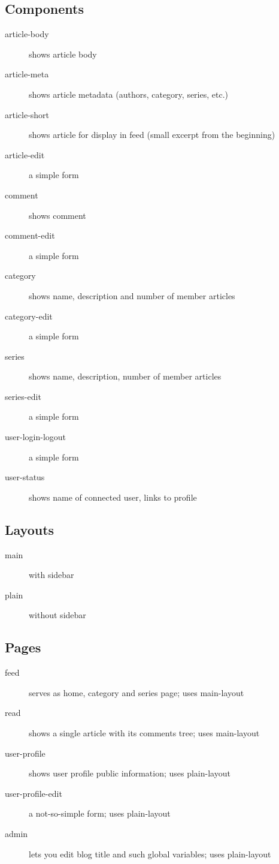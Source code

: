 \documentclass[a4paper, 11pt]{article}
\begin{document}
\subsection{Components}
\begin{description}
	\item[article-body] shows article body
	\item[article-meta] shows article metadata (authors, category, series, etc.)
	\item[article-short] shows article for display in feed (small excerpt from the beginning)
	\item[article-edit] a simple form
	\item[comment] shows comment
	\item[comment-edit] a simple form
	\item[category] shows name, description and number of member articles
	\item[category-edit] a simple form
	\item[series] shows name, description, number of member articles
	\item[series-edit] a simple form
	\item[user-login-logout] a simple form
	\item[user-status] shows name of connected user, links to profile
\end{description}

\subsection{Layouts}
\begin{description}
	\item[main] with sidebar
	\item[plain] without sidebar
\end{description}

\subsection{Pages}
\begin{description}
	\item[feed] serves as home, category and series page; uses main-layout
	\item[read] shows a single article with its comments tree; uses main-layout
	\item[user-profile] shows user profile public information; uses plain-layout
	\item[user-profile-edit] a not-so-simple form; uses plain-layout
	\item[admin] lets you edit blog title and such global variables; uses plain-layout
\end{description}
\end{document}
